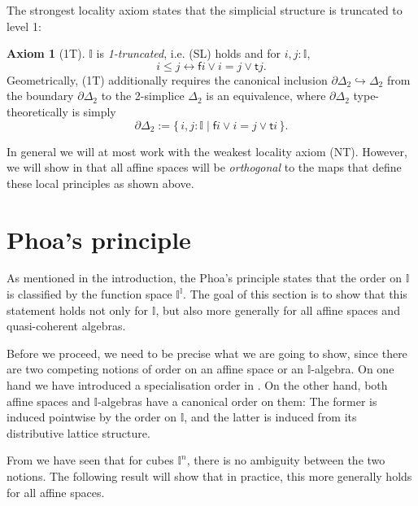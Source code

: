 \documentclass[12pt]{amsart}
\theoremstyle{definition}
\newtheorem*{axiom}{Axiom}
\newcommand{\mbb}[1]{\mathbb{#1}}
\newcommand{\I}{\mbb I}
\newcommand{\ms}[1]{\mathsf{#1}}
\newcommand{\scomp}[2]{\{\,#1\mid#2\,\}}
\newcommand{\hook}{\hookrightarrow}
\newcommand{\eq}{\leftrightarrow}
\begin{document}
The strongest locality axiom states that the simplicial structure is truncated to level 1:

\begin{axiom}[1T]\label{ax:1T}
  $\I$ is \emph{1-truncated}, i.e. (SL) holds and for $i,j : \I$, 
  \[ i \le j \eq \ms fi \vee i = j \vee \ms tj. \]
  Geometrically, (1T) additionally requires the canonical inclusion $\partial\Delta_2 \hook \Delta_2$ from the boundary $\partial\Delta_2$ to the 2-simplice $\Delta_2$ is an equivalence, where $\partial\Delta_2$ type-theoretically is simply
  \[ \partial\Delta_2 := \scomp{i,j : \I}{\ms fi \vee i = j \vee \ms ti}. \]
\end{axiom}

In general we will at most work with the weakest locality axiom (NT). However, we will show in  that all affine spaces will be \emph{orthogonal} to the maps that define these local principles as shown above.


\section{Phoa's principle}\label{sec:intposet}

As mentioned in the introduction, the Phoa's principle states that the order on $\I$ is classified by the function space $\I^\I$. The goal of this section is to show that this statement holds not only for $\I$, but also more generally for all affine spaces and quasi-coherent algebras.

Before we proceed, we need to be precise what we are going to show, since there are two competing notions of order on an affine space or an $\I$-algebra. On one hand we have introduced a specialisation order in . On the other hand, both affine spaces and $\I$-algebras have a canonical order on them: The former is induced pointwise by the order on $\I$, and the latter is induced from its distributive lattice structure. 

From  we have seen that for cubes $\I^n$, there is no ambiguity between the two notions. The following result will show that in practice, this more generally holds for all affine spaces.
\end{document}
